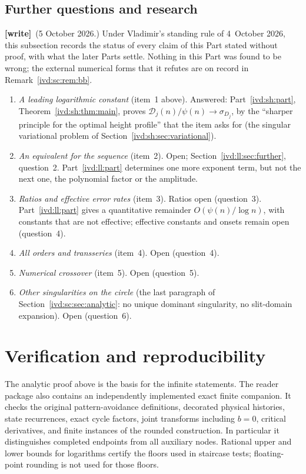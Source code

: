\documentclass[11pt,letterpaper]{article}
\theoremstyle{remark}\newtheorem{remark}[theorem]{Remark}
\numberwithin{equation}{section}
\newcommand{\Dfc}{\mathcal D}
\newcommand{\wtag}{\textup{\textbf{[write]}}}
\begin{document}
\subsection{Further questions and research}\label{ivd:sc:sub:further}
\wtag\ (5 October 2026.) Under Vladimir's standing rule of 4~October 2026, this subsection records the status of every claim of this Part stated without proof, with what the later Parts settle. Nothing in this Part was found to be wrong; the external numerical forms that it refutes are on record in Remark~\ref{ivd:sc:rem:bb}.
\begin{enumerate}
\item \emph{A leading logarithmic constant} (item~1 above). Answered: Part~\ref{ivd:sh:part}, Theorem~\ref{ivd:sh:thm:main}, proves $\Dfc_j(n)/\psi(n)\to\sigma_{D_j}$, by the ``sharper principle for the optimal height profile'' that the item asks for (the singular variational problem of Section~\ref{ivd:sh:sec:variational}).
\item \emph{An equivalent for the sequence} (item~2). Open; Section~\ref{ivd:ll:sec:further}, question~2. Part~\ref{ivd:ll:part} determines one more exponent term, but not the next one, the polynomial factor or the amplitude.
\item \emph{Ratios and effective error rates} (item~3). Ratios open (question~3). Part~\ref{ivd:ll:part} gives a quantitative remainder $O(\psi(n)/\log n)$, with constants that are not effective; effective constants and onsets remain open (question~4).
\item \emph{All orders and transseries} (item~4). Open (question~4).
\item \emph{Numerical crossover} (item~5). Open (question~5).
\item \emph{Other singularities on the circle} (the last paragraph of Section~\ref{ivd:sc:sec:analytic}: no unique dominant singularity, no slit-domain expansion). Open (question~6).
\end{enumerate}

\section{Verification and reproducibility}\label{ivd:sc:sec:verification}
The analytic proof above is the basis for the infinite statements.
The reader package also contains an independently implemented exact
finite companion. It checks the original pattern-avoidance definitions,
decorated physical histories, state recurrences, exact cycle factors,
joint transforms including $b=0$, critical derivatives, and finite
instances of the rounded construction. In particular it distinguishes
completed endpoints from all auxiliary nodes. Rational upper and lower
bounds for logarithms certify the floors used in staircase tests;
floating-point rounding is not used for those floors.
\end{document}

